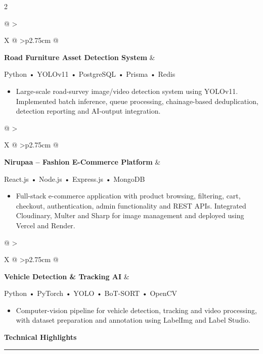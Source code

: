 ﻿\documentclass[10pt,a4paper]{article}
\makeatletter
\newcommand{\cvsection}[1]{%
    \vspace{3pt}
    {\large\bfseries\textcolor{darkcol}{#1}}
    \par
    \vspace{2pt}
    {\color{accentcol}\rule{\linewidth}{1.1pt}}
    \vspace{3pt}
}
\newcommand{\datebox}[1]{%
    \colorbox{accentcol}{%
        \makebox[2.75cm][c]{%
            \textcolor{white}{\scriptsize\bfseries #1}
        }%
    }%
}
\newcommand{\event}[4]{%

    \vspace{1pt}

    \noindent
    \begin{tabularx}{\linewidth}{
        @{}
        >{\raggedright\arraybackslash}X
        @{\hspace{5pt}}
        >{\raggedleft\arraybackslash}p{2.75cm}
        @{}
    }
        {\small\bfseries\textcolor{darkcol}{#2}}
        &
        \datebox{#1}
    \end{tabularx}

    \vspace{1pt}

    {\small\textcolor{lightcol}{#3}}

    \vspace{1pt}

    #4

    \vspace{2pt}
}
\makeatother
\begin{document}
\begin{paracol}{2}

\event
{2025 -- Present}
{Road Furniture Asset Detection System}
{Python • YOLOv11 • PostgreSQL • Prisma • Redis}
{
\begin{itemize}

\item {\small
Large-scale road-survey image/video detection system using
YOLOv11. Implemented batch inference, queue processing,
chainage-based deduplication, detection reporting and
AI-output integration.
}

\end{itemize}
}


\event
{2024 -- Present}
{Nirupaa -- Fashion E-Commerce Platform}
{React.js • Node.js • Express.js • MongoDB}
{
\begin{itemize}

\item {\small
Full-stack e-commerce application with product browsing,
filtering, cart, checkout, authentication, admin functionality
and REST APIs. Integrated Cloudinary, Multer and Sharp for
image management and deployed using Vercel and Render.
}

\end{itemize}
}


\event
{2024 -- Present}
{Vehicle Detection \& Tracking AI}
{Python • PyTorch • YOLO • BoT-SORT • OpenCV}
{
\begin{itemize}

\item {\small
Computer-vision pipeline for vehicle detection, tracking and
video processing, with dataset preparation and annotation using
LabelImg and Label Studio.
}

\end{itemize}
}


\cvsection{Technical Highlights}

\begin{itemize}


\end{itemize}
\end{paracol}
\end{document}
